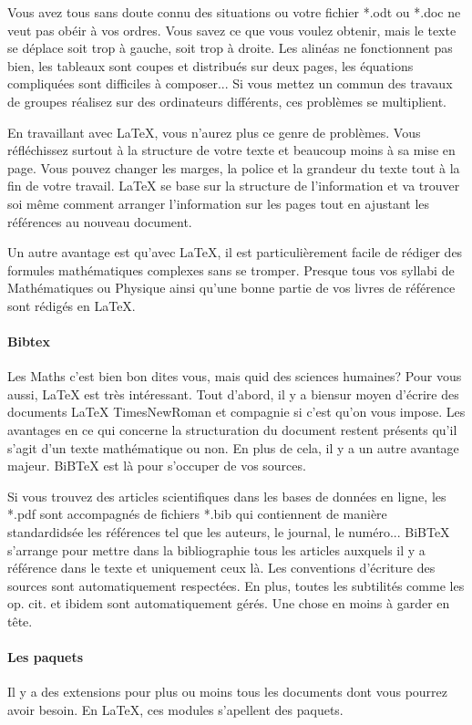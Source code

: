 Vous avez tous sans doute connu des situations ou votre fichier *.odt ou *.doc ne veut pas obéir à vos ordres. Vous savez ce que vous voulez obtenir, mais le texte se déplace soit trop à gauche, soit trop à droite. Les alinéas ne fonctionnent pas bien, les tableaux sont coupes et distribués sur deux pages, les équations compliquées sont difficiles à composer... Si vous mettez un commun des travaux de groupes réalisez sur des ordinateurs différents, ces problèmes se multiplient.

En travaillant avec \LaTeX{}, vous n'aurez plus ce genre de problèmes. Vous réfléchissez surtout à la structure de votre texte et beaucoup moins à sa mise en page. Vous pouvez changer les marges, la police et la grandeur du texte tout à la fin de votre travail. \LaTeX{} se base sur la structure de l'information et va trouver soi même comment arranger l'information sur les pages tout en ajustant les références au nouveau document.

Un autre avantage est qu'avec \LaTeX{}, il est particulièrement facile de rédiger des formules mathématiques complexes sans se tromper. Presque tous vos syllabi de Mathématiques ou Physique ainsi qu'une bonne partie de vos livres de référence sont rédigés en \LaTeX{}.

\paragraph{Bibtex}
Les Maths c'est bien bon dites vous, mais quid des sciences humaines? Pour vous aussi, \LaTeX{} est très intéressant. Tout d'abord, il y a biensur moyen d'écrire des documents \LaTeX{} TimesNewRoman et compagnie si c'est qu'on vous impose.
Les avantages en ce qui concerne la structuration du document restent présents qu'il s'agit d'un texte mathématique ou non. En plus de cela, il y a un autre avantage majeur. BiB\TeX{} est là pour s'occuper de vos sources.

Si vous trouvez des articles scientifiques dans les bases de données en ligne, les *.pdf sont accompagnés de fichiers *.bib qui contiennent de manière standardidsée les références tel que les auteurs, le journal, le numéro... BiB\TeX{} s'arrange pour mettre dans la bibliographie tous les articles auxquels il y a référence dans le texte et uniquement ceux là. Les conventions d'écriture des sources sont automatiquement respectées. En plus, toutes les subtilités comme les op. cit. et ibidem sont automatiquement gérés. Une chose en moins à garder en tête.

\paragraph{Les paquets}
Il y a des extensions pour plus ou moins tous les documents dont vous pourrez avoir besoin. En \LaTeX, ces modules s'apellent des paquets. 

